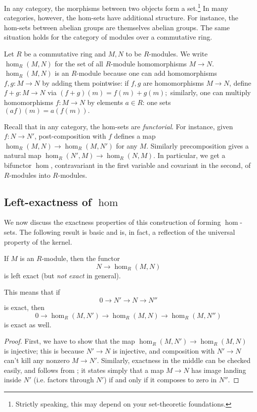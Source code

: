 In any category, the morphisms between two objects form a
set.\footnote{Strictly speaking, this may depend on your set-theoretic
foundations.} In many
categories, however, the hom-sets have additional structure. For instance,
the hom-sets
between abelian groups are themselves abelian groups. The same situation holds
for the category of modules over a commutative ring.


\begin{definition}
Let $R$ be a commutative ring and $M,N$ to be $R$-modules.  We write
$\hom_R(M,N)$ for
the set of all $R$-module homomorphisms $M \to N$.
 $\hom_R(M,N)$ is an $R$-module because one can add homomorphisms $f,g: M
\to N$ by adding
them pointwise: if $f,g$ are homomorphisms $M \to N$, define $f+g: M \to N$ via
\( (f+g)(m) = f(m)+g(m);  \)
similarly, one can multiply homomorphisms $f: M \to N$ by elements  $ a \in
R$: one sets
\( (af)(m) = a(f(m)).  \)
\end{definition}

Recall that in any category, the hom-sets are \emph{functorial}. For instance,
given $f: N \to N'$, post-composition with $f$ defines a map $\hom_R(M,N) \to
\hom_R(M,N')$ for any $M$.
Similarly precomposition gives  a natural map $\hom_R(N', M) \to \hom_R(N, M)$.
In particular, we get a bifunctor $\hom$, contravariant in the first variable
and covariant in the second, of $R$-modules into $R$-modules.

\subsection{Left-exactness of $\hom$}

We now discuss the exactness properties of this construction of forming
$\hom$-sets. The following result is basic and is, in fact, a reflection of
the universal property of the kernel.
\begin{proposition} \label{homcovleftexact}
If $M$ is an $R$-module, then the functor
\[ N \to \hom_R(M,N)  \]
is left exact (but \emph{not exact} in general).
\end{proposition}
This means that if
\[ 0 \to N' \to N \to N''  \]
is exact,
then
\[ 0 \to \hom_R(M, N') \to \hom_R(M, N) \to \hom_R(M, N'')  \]
is exact as well.

\begin{proof}
 First, we have to show that the map
$\hom_R(M,N') \to \hom_R(M,N)$ is injective; this is because $N' \to N$ is
injective, and composition with $N' \to N$ can't kill any nonzero $M \to N'$.
Similarly, exactness in the middle can be checked easily, and follows from
; it states simply that a map $M \to N$ has
image landing inside $N'$ (i.e. factors through $N'$) if and only if it
composes to zero in $N''$.
\end{proof}

